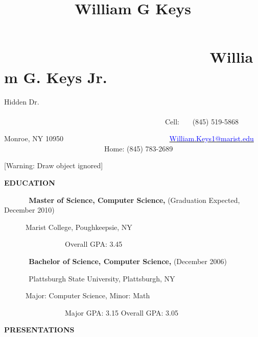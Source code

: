\documentclass{article}
\title{William G Keys}
\newcommand\textstyleInternetlink[1]{\textcolor{blue}{#1}}
\begin{document}
\clearpage\setcounter{page}{1}\pagestyle{Standard}
\section[\ \ \ \ \ \ \ \ \ \ \ \ \ \ \ \ \ \ \ \ \ \ \ \ \ William G.
Keys Jr.    
]{\ \ \ \ \ \ \ \ \ \ \ \ \ \ \ \ \ \ \ \ \ \ \ \ \ William G. Keys Jr.
    }
{ Hidden Dr.
\ \ \ \ \ \ \ \ \ \ \ \ \ \ \ \ \ \ \ \ \ \ \ \ \ \ \ \ \ \ \ \ \ \ \ \ \ \ \ \ \ \ \ \ \ \ \ \ \ \ \ \ \ \ \ \ \ \ \ \ \ \ \ \ \ \ \ \ \ \ \ \ \ \ \ \ \ \ \ \ \ \ \ \ \ \ \ \ \ \ \ \ \ \ \ \ \ \ \ \ \ \ \ \ \ \ \ \ \ \ \ \ \ \ \ \ \ Cell:
\ \ \ (845) 519-5868}

{\sffamily
Monroe, NY 10950
\ \ \ \ \ \ \ \ \ \ \ \ \ \ \ \ \ \ \ \ \ \ \ \ \ \ \ \ \ \href{mailto:yzrider261@gmail.com}{\textstyleInternetlink{William.Keys1@marist.edu}}
\ \ \ \ \ \ \ \ \ \ \ \ \ \ \ \ \ \ \ \ \ \ \ \ \ \ \ \ Home: (845)
783-2689 }

\bigskip

[Warning: Draw object ignored]


\bigskip

{\sffamily\bfseries
EDUCATION}


\bigskip

{\sffamily
\textbf{\ \ \ \ \ \ Master of Science, Computer Science,} (Graduation
Expected, December 2010)}

{\sffamily
\ \ \ \ \ \ Marist College, Poughkeepsie, NY}

{\sffamily
\ \ \ \ \ \ \ \ \ \ \ \ \ \ \ \ \ Overall GPA: 3.45}


\bigskip

{\sffamily
\textbf{\ \ \ \ \ \ Bachelor of Science, Computer Science, }(December
2006) }

{\sffamily
\textbf{\ \ \ \ \ \ }Plattsburgh State University, Plattsburgh, NY}

{\sffamily
\ \ \ \ \ \ Major: Computer Science, Minor: Math \ \ \ \ \ \ }

{\sffamily
\ \ \ \ \ \ \ \ \ \ \ \ \ \ \ \ \ Major GPA: 3.15 Overall GPA: 3.05
\ \ \ \ \ \ \ \ \ \ \ \ \ \ }


\bigskip

{\sffamily\bfseries
PRESENTATIONS}
\end{document}
